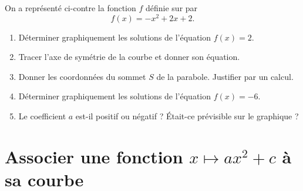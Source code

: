 \documentclass[11pt,a4paper]{book}
\begin{document}
\exerciceDS{}

\begin{minipage}[c]{0.5\linewidth}
	On a représenté ci-contre la fonction $f$ définie sur \R par
	$$f(x)=-x^2+2x+2.$$
	\begin{enumerate}[label=\textbf{\arabic*)}]
		\item Déterminer graphiquement les solutions de l'équation $f(x)=2$.
		\item Tracer l'axe de symétrie de la courbe et donner son équation.
		\item Donner les coordonnées du sommet $S$ de la parabole. Justifier par un calcul.
		\item Déterminer graphiquement les solutions de l'équation $f(x)=-6$.
		\item Le coefficient $a$ est-il positif ou négatif ? Était-ce prévisible sur le graphique ?
	\end{enumerate}
\end{minipage} \hfill
\begin{minipage}[c]{0.46\linewidth}
	\begin{center}
	\end{center}
\end{minipage}

\section*{\color{green!55!black}Associer une fonction $x\mapsto ax^2+c$ à sa courbe}

\exerciceDS{}
\end{document}
